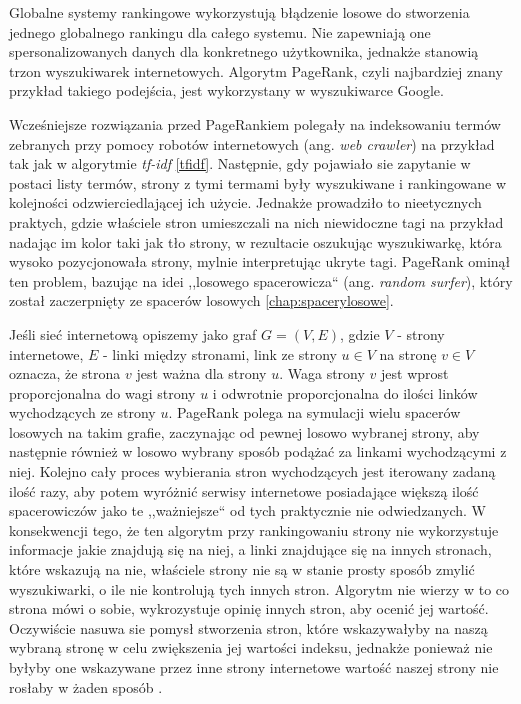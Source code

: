 Globalne systemy rankingowe wykorzystują błądzenie losowe do stworzenia jednego globalnego rankingu dla całego systemu. Nie zapewniają one spersonalizowanych danych dla konkretnego użytkownika, jednakże stanowią trzon wyszukiwarek internetowych. Algorytm PageRank, czyli najbardziej znany przykład takiego podejścia, jest wykorzystany w wyszukiwarce Google. 


Wcześniejsze rozwiązania przed PageRankiem polegały na indeksowaniu termów zebranych przy pomocy robotów internetowych (ang. \textit{web crawler}) na przykład tak jak w algorytmie \textit{tf-idf} \ref{tfidf}. Następnie, gdy pojawiało sie zapytanie w postaci listy termów, strony z tymi termami były wyszukiwane i rankingowane w kolejności odzwierciedlającej ich użycie. Jednakże prowadziło to nieetycznych praktych, gdzie właściele stron umieszczali na nich niewidoczne tagi na przykład nadając im kolor taki jak tło strony, w rezultacie oszukując wyszukiwarkę, która wysoko pozycjonowała strony, mylnie interpretując ukryte tagi. PageRank ominął ten problem, bazując na idei ,,losowego spacerowicza`` (ang. \textit{random surfer}), który został zaczerpnięty ze spacerów losowych \ref{chap:spacerylosowe}.

Jeśli sieć internetową opiszemy jako graf $G = (V, E)$, gdzie $V$ - strony internetowe, $E$ - linki między stronami, link ze strony $u \in V$ na stronę $v \in V$ oznacza, że strona $v$ jest ważna dla strony $u$. Waga strony $v$ jest wprost proporcjonalna do wagi strony $u$ i odwrotnie proporcjonalna do ilości linków wychodzących ze strony $u$. PageRank polega na symulacji wielu spacerów losowych na takim grafie, zaczynając od pewnej losowo wybranej strony, aby następnie również w losowo wybrany sposób podążać za linkami wychodzącymi z niej. Kolejno cały proces wybierania stron wychodzących jest iterowany zadaną ilość razy, aby potem wyróżnić serwisy internetowe posiadające większą ilość spacerowiczów jako te ,,ważniejsze`` od tych praktycznie nie odwiedzanych. W konsekwencji tego, że ten algorytm przy rankingowaniu strony nie wykorzystuje informacje jakie znajdują się na niej, a linki znajdujące się na innych stronach, które wskazują na nie, właściele strony nie są w stanie prosty sposób zmylić wyszukiwarki, o ile nie kontrolują tych innych stron. Algorytm nie wierzy w to co strona mówi o sobie, wykrozystuje opinię innych stron, aby ocenić jej wartość. Oczywiście nasuwa sie pomysł stworzenia stron, które wskazywałyby na naszą wybraną stronę w celu zwiększenia jej wartości indeksu, jednakże ponieważ nie byłyby one wskazywane przez inne strony internetowe wartość naszej strony nie rosłaby w żaden sposób \cite{MiningofMassiveDatasets}.


